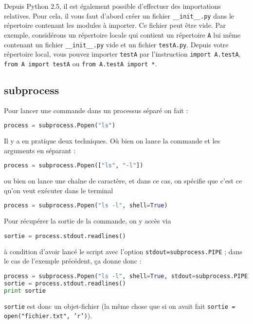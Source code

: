 \documentclass[a4paper,twoside]{article}
\begin{document}
\bigskip

Depuis Python 2.5, il est également possible d'effectuer des importations relatives. Pour cela, il vous faut d'abord créer un fichier \verb|__init__.py| dans le répertoire contenant les modules à importer. Ce fichier peut être vide. Par exemple, considérons un répertoire locale qui contient un répertoire \texttt{A} lui même contenant un fichier \verb|__init__.py| vide et un fichier \texttt{testA.py}. Depuis votre répertoire local, vous pouvez importer \texttt{testA} par l'instruction \texttt{import A.testA}, \texttt{from A import testA} ou \texttt{from A.testA import *}.

\subsection{subprocess}\label{sec:subprocess}
Pour lancer une commande dans un processus séparé on fait :
\begin{lstlisting}[language=python]
process = subprocess.Popen("ls")
\end{lstlisting}

Il y a en pratique deux techniques. Où bien on lance la commande et les arguments en séparant :
\begin{lstlisting}[language=python]
process = subprocess.Popen(["ls", "-l"])
\end{lstlisting}
ou bien on lance une chaîne de caractère, et dans ce cas, on spécifie que c'est ce qu'on veut exécuter dans le terminal
\begin{lstlisting}[language=python]
process = subprocess.Popen("ls -l", shell=True)
\end{lstlisting}

\bigskip

Pour récupérer la sortie de la commande, on y accès via
\begin{lstlisting}[language=python]
sortie = process.stdout.readlines()
\end{lstlisting}
à condition d'avoir lancé le script avec l'option \verb|stdout=subprocess.PIPE| ; dans le cas de l'exemple précédent, ça donne donc :
\begin{lstlisting}[language=python]
process = subprocess.Popen("ls -l", shell=True, stdout=subprocess.PIPE)
sortie = process.stdout.readlines()
print sortie
\end{lstlisting}

\begin{remarque}
\verb|sortie| est donc un objet-fichier (la même chose que si on avait fait \texttt{sortie = open("fichier.txt", 'r')}).
\end{remarque}
\end{document}
